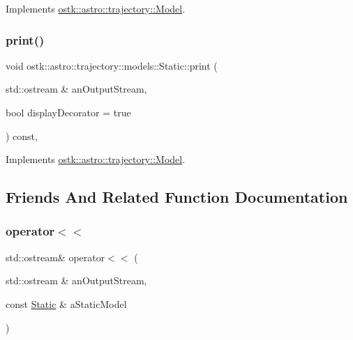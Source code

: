 Implements \hyperlink{classostk_1_1astro_1_1trajectory_1_1_model_a874f79846e845859c070ce1b9874fc9c}{ostk\+::astro\+::trajectory\+::\+Model}.

\mbox{\label{classostk_1_1astro_1_1trajectory_1_1models_1_1_static_aae663f763324f081911ea47070c9f79f}} 
\subsubsection{\texorpdfstring{print()}{print()}}
{\footnotesize\ttfamily void ostk\+::astro\+::trajectory\+::models\+::\+Static\+::print (\begin{DoxyParamCaption}\item[{std\+::ostream \&}]{an\+Output\+Stream,  }\item[{bool}]{display\+Decorator = {\ttfamily true} }\end{DoxyParamCaption}) const\hspace{0.3cm}{\ttfamily [override]}, {\ttfamily [virtual]}}



Implements \hyperlink{classostk_1_1astro_1_1trajectory_1_1_model_a4b2098483430a820481ed50b81656e31}{ostk\+::astro\+::trajectory\+::\+Model}.



\subsection{Friends And Related Function Documentation}
\mbox{\label{classostk_1_1astro_1_1trajectory_1_1models_1_1_static_a6494cb538d45101dc20cb3910455cb13}} 
\subsubsection{\texorpdfstring{operator$<$$<$}{operator<<}}
{\footnotesize\ttfamily std\+::ostream\& operator$<$$<$ (\begin{DoxyParamCaption}\item[{std\+::ostream \&}]{an\+Output\+Stream,  }\item[{const \hyperlink{classostk_1_1astro_1_1trajectory_1_1models_1_1_static}{Static} \&}]{a\+Static\+Model }\end{DoxyParamCaption})\hspace{0.3cm}{\ttfamily [friend]}}



